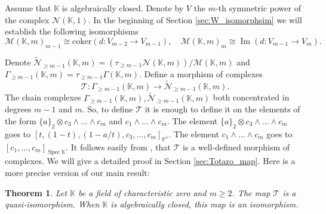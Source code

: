 \documentclass[12pt]{extarticle}
\newtheorem{theorem}{Theorem}[section]
\newtheorem{remark}[theorem]{Remark}
\def\mb{\mathbb}
\def\mc{\mathcal}
\def\k{\mb K}
\def\Q{\mb Q}
\def\N{\mc N}
\def\wt{\widetilde}
\renewcommand{\P}{{\mb P}}
\def\wdw{\wedge\dots\wedge}
\def\T{\mc T}
\def \CH{\mc{N}}
\def \wCH{\wt{\CH}_{\geq m-1}}
\def \G{\Gamma}
\def \wG{\Gamma_{\geq m-1}}
\def \M{\mc M}
\DeclareMathOperator{\im}{Im}
\DeclareMathOperator{\spec}{Spec}
\begin{document}
Assume that $\k$ is algebraically closed. Denote by $V$ the $m$-th symmetric power of the complex $\N(\k,1)$. In the beginning of Section \ref{sec:W_isomorphsim} we will establish the following isomorphisms $$\mc M(\k,m)_{m-1}\cong\mathrm{coker}(d\colon V_{m-2}\to V_{m-1}),\quad \M(\k,m)_m\cong \im(d\colon V_{m-1}\to V_m).$$

Denote $\wCH(\k,m)=(\tau_{\geq m-1}\CH(\k,m))/\M(\k,m)$ and $\wG(\k,m)=\tau_{\geq m-1}\G(\k,m)$. Define a morphism of complexes $$\T\colon \wG(\k,m)\to \wCH(\k,m).$$  The chain complexes $\wG(\k,m),\wCH(\k,m)$ both concentrated in degrees $m-1$ and $m$. So, to define $\T$ it is enough to define it on the elements of the form $\{a\}_2\otimes c_3\wdw c_{m}$ and $c_1\wdw c_m$. The element $\{a\}_2\otimes c_3\wdw c_{m}$ goes to 
$[t,(1-t),(1-a/t),c_3,\dots, c_{m}]_{\P^1}.$ The element $c_1\wdw c_m$ goes to
$[c_1,\dots, c_m]_{\spec\k}.$ It follows easily from \cite{cubical1999herbert}, that $\T$ is a well-defined morphism of complexes. We will give a detailed proof in Section \ref{sec:Totaro_map}. Here is a more precise version of our main result:

\begin{theorem}
\label{th:main_second_intro}
    Let $\k$ be a field of characteristic zero and $m\geq 2$. The map $\T$ is a quasi-isomorphism. When $\k$ is algebraically closed, this map is an isomorphism.
\end{theorem}

\end{document}
